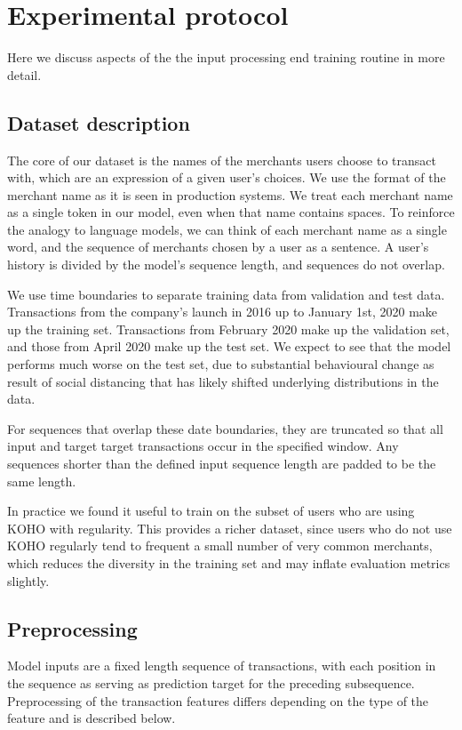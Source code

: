 \documentclass{article}
\begin{document}
\section{Experimental protocol}
Here we discuss aspects of the the input processing end training routine in more detail.

\subsection{Dataset description}
The core of our dataset is the names of the merchants users choose to transact with, which are an expression of a given user’s choices. We use the format of the merchant name as it is seen in production systems. We treat each merchant name as a single token in our model, even when that name contains spaces. To reinforce the analogy to language models, we can think of each merchant name as a single word, and the sequence of merchants chosen by a user as a sentence. A user's history is divided by the model's sequence length, and sequences do not overlap.

We use time boundaries to separate training data from validation and test data. Transactions from the company’s launch in 2016 up to January 1st, 2020 make up the training set. Transactions from February 2020 make up the validation set, and those from April 2020 make up the test set. We expect to see that the model performs much worse on the test set, due to substantial behavioural change as result of social distancing that has likely shifted underlying distributions in the data.

For sequences that overlap these date boundaries, they are truncated so that all input and target target transactions occur in the specified window. Any sequences shorter than the defined input sequence length are padded to be the same length.

In practice we found it useful to train on the subset of users who are using KOHO with regularity. This provides a richer dataset, since users who do not use KOHO regularly tend to frequent a small number of very common merchants, which reduces the diversity in the training set and may inflate evaluation metrics slightly.

\subsection{Preprocessing}
Model inputs are a fixed length sequence of transactions, with each position in the sequence as serving as prediction target for the preceding subsequence. Preprocessing of the transaction features differs depending on the type of the feature and is described below.
\end{document}
